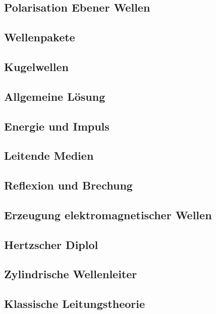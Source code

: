 \subsection{Polarisation Ebener Wellen}

\subsection{Wellenpakete}

\subsection{Kugelwellen}

\subsection{Allgemeine Lösung}

\subsection{Energie und Impuls}

\subsection{Leitende Medien}

\subsection{Reflexion und Brechung}

\subsection{Erzeugung elektromagnetischer Wellen}

\subsection{Hertzscher Diplol}

\subsection{Zylindrische Wellenleiter}

\subsection{Klassische Leitungstheorie}




